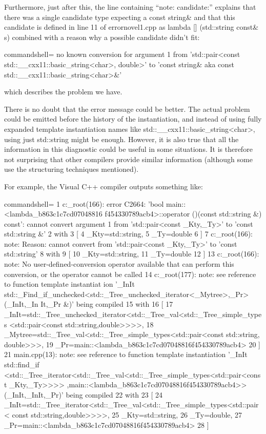 Furthermore, just after this, the line containing “note: candidate:” explains that there was a single candidate type expecting a const string\& and that this candidate is defined in line 11 of errornovel1.cpp as lambda [] (std::string const\& s) combined with a reason why a possible candidate didn’t fit:

\begin{tcblisting}{commandshell={}}
no known conversion for argument 1
from ’std::pair<const std::__cxx11::basic_string<char>, double>’
to ’const string& {aka const std::__cxx11::basic_string<char>&}’
\end{tcblisting}

which describes the problem we have.

There is no doubt that the error message could be better. The actual problem could be emitted before the history of the instantiation, and instead of using fully expanded template instantiation names like std::\_\_cxx11::basic\_string<char>, using just std::string might be enough. However, it is also true that all the information in this diagnostic could be useful in some situations. It is therefore not surprising that other compilers provide similar information (although some use the structuring techniques mentioned).

For example, the Visual C++ compiler outputs something like:

\begin{tcblisting}{commandshell={}}
1 c:\tools_root\cl\inc\algorithm(166): error C2664: ’bool main::<lambda_b863c1c7cd07048816
f454330789acb4>::operator ()(const std::string &) const’: cannot convert argument 1 from
’std::pair<const _Kty,_Ty>’ to ’const std::string &’
2 with
3 [
4 _Kty=std::string,
5 _Ty=double
6 ]
7 c:\tools_root\cl\inc\algorithm(166): note: Reason: cannot convert from ’std::pair<const
_Kty,_Ty>’ to ’const std::string’
8 with
9 [
10 _Kty=std::string,
11 _Ty=double
12 ]
13 c:\tools_root\cl\inc\algorithm(166): note: No user-defined-conversion operator available
that can perform this conversion, or the operator cannot be called
14 c:\tools_root\cl\inc\algorithm(177): note: see reference to function template instantiat
ion ’_InIt std::_Find_if_unchecked<std::_Tree_unchecked_iterator<_Mytree>,_Pr>(_InIt,_In
It,_Pr &)’ being compiled
15 with
16 [
17 _InIt=std::_Tree_unchecked_iterator<std::_Tree_val<std::_Tree_simple_types
<std::pair<const std::string,double>>>>,
18 _Mytree=std::_Tree_val<std::_Tree_simple_types<std::pair<const std::string,
double>>>,
19 _Pr=main::<lambda_b863c1c7cd07048816f454330789acb4>
20 ]
21 main.cpp(13): note: see reference to function template instantiation ’_InIt std::find_if
<std::_Tree_iterator<std::_Tree_val<std::_Tree_simple_types<std::pair<const _Kty,_Ty>>>>
,main::<lambda_b863c1c7cd07048816f454330789acb4>>(_InIt,_InIt,_Pr)’ being compiled
22 with
23 [
24 _InIt=std::_Tree_iterator<std::_Tree_val<std::_Tree_simple_types<std::pair<
const std::string,double>>>>,
25 _Kty=std::string,
26 _Ty=double,
27 _Pr=main::<lambda_b863c1c7cd07048816f454330789acb4>
28 ]
\end{tcblisting}

